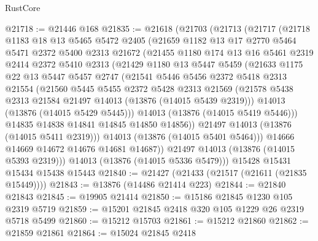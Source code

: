 \begin{lexlean}{RustCore}
\begin{coremodule}
@21718 := @21446 @168
@21835 := @21618
    (@21703
      (@21713
        (@21717
          (@21718
            @1183
            @18
            @13
            @5465
            @5472
            @2405
            (@21659
              @1182
              @13
              @17
              @2770
              @5464
              @5471
              @2372
              @5400
              @2313
              @21672
              (@21455
                @1180
                @174
                @13
                @16
                @5461
                @2319
                @2414
                @2372
                @5410
                @2313
                (@21429
                  @1180
                  @13
                  @5447
                  @5459
                  (@21633
                    @1175
                    @22
                    @13
                    @5447
                    @5457
                    @2747
                    (@21541
                      @5446
                      @5456
                      @2372
                      @5418
                      @2313
                      @21554
                      (@21560
                        @5445
                        @5455
                        @2372
                        @5428
                        @2313
                        @21569
                        (@21578 @5438 @2313 @21584 @21497 @14013 (@13876 (@14015 @5439 @2319)))
                        @14013
                        (@13876 (@14015 @5429 @5445)))
                      @14013
                      (@13876 (@14015 @5419 @5446)))
                    @14835
                    @14838
                    @14841
                    @14845
                    @14850
                    @14856))
                @21497
                @14013
                (@13876 (@14015 @5411 @2319)))
              @14013
              (@13876 (@14015 @5401 @5464)))
            @14666
            @14669
            @14672
            @14676
            @14681
            @14687))
        @21497
        @14013
        (@13876 (@14015 @5393 @2319)))
      @14013
      (@13876 (@14015 @5336 @5479)))
    @15428
    @15431
    @15434
    @15438
    @15443
@21840 := @21427 (@21433 (@21517 (@21611 (@21835 @15449))))
@21843 := @13876 (@14486 @21414 @223)
@21844 := @21840 @21843
@21845 := @19905 @21414
@21850 := @15186 @21845 @1230 @105 @2319 @5719
@21859 := @15201 @21845 @2418 @320 @105 @1229 @26 @2319 @5718 @5499
@21860 := @15212 @15703
@21861 := @15212 @21860
@21862 := @21859 @21861
@21864 := @15024 @21845 @2418

\end{coremodule}
\end{lexlean}
